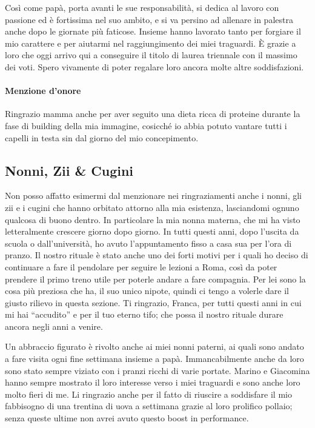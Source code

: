 Così come papà, porta avanti le sue responsabilità, si dedica
al lavoro con passione ed è fortissima nel suo ambito, e si va persino
ad allenare in palestra anche dopo le giornate più faticose. Insieme
hanno lavorato tanto per forgiare il mio carattere e per aiutarmi nel
raggiungimento dei miei traguardi. È grazie a loro che oggi arrivo qui
a conseguire il titolo di laurea triennale con il massimo dei voti.
Spero vivamente di poter regalare loro ancora molte altre
soddisfazioni.

\paragraph{Menzione d'onore}
Ringrazio mamma anche per aver seguito una dieta
ricca di proteine durante la fase di building della mia immagine,
cosicché io abbia potuto vantare tutti i capelli in testa sin dal
giorno del mio concepimento.

\subsection{Nonni, Zii \& Cugini}
Non posso affatto esimermi dal menzionare nei ringraziamenti anche i
nonni, gli zii e i cugini che hanno orbitato attorno alla mia
esistenza, lasciandomi ognuno qualcosa di buono dentro. In particolare
la mia nonna materna, che mi ha visto letteralmente crescere giorno
dopo giorno. In tutti questi anni, dopo l'uscita da scuola o
dall'università, ho avuto l'appuntamento fisso a casa sua per l'ora di
pranzo. Il nostro rituale è stato anche uno dei forti motivi per i
quali ho deciso di continuare a fare il pendolare per seguire le
lezioni a Roma, così da poter prendere il primo treno utile per poterle
andare a fare compagnia. Per lei sono la cosa più preziosa che ha, il
suo unico nipote, quindi ci tengo a volerle dare il giusto rilievo in
questa sezione. Ti ringrazio, Franca, per tutti questi anni in cui mi
hai ``accudito'' e per il tuo eterno tifo; che possa il nostro rituale
durare ancora negli anni a venire.

Un abbraccio figurato è rivolto anche ai miei nonni paterni, ai quali
sono andato a fare visita ogni fine settimana insieme a papà.
Immancabilmente anche da loro sono stato sempre viziato con i pranzi
ricchi di varie portate. Marino e Giacomina hanno sempre mostrato il
loro interesse verso i miei traguardi e sono anche loro molto fieri di
me. Li ringrazio anche per il fatto di riuscire a soddisfare il mio
fabbisogno di una trentina di uova a settimana grazie al loro prolifico
pollaio; senza queste ultime non avrei avuto questo boost in
performance.

